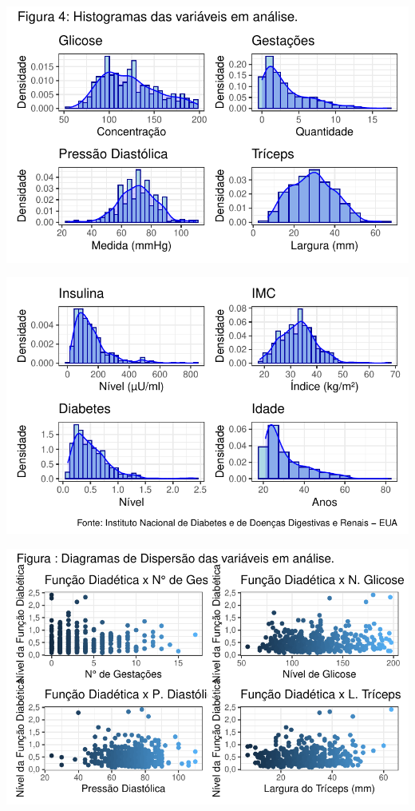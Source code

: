 \documentclass[
  letterpaper,
  DIV=11,
  numbers=noendperiod]{scrartcl}
\begin{document}
\includegraphics{relatorio_lab1_files/figure-pdf/unnamed-chunk-10-1.pdf}

\includegraphics{relatorio_lab1_files/figure-pdf/unnamed-chunk-10-2.pdf}

\includegraphics{relatorio_lab1_files/figure-pdf/unnamed-chunk-11-1.pdf}
\end{document}
